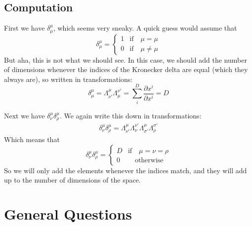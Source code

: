 \documentclass{article}
\begin{document}
		\subsection{Computation}
			First we have $\delta_\mu^\mu$, which seems very sneaky. A quick guess would assume that 
			$$ \delta_\mu^\mu = \begin{cases}
				1 & \text{if} \quad \mu = \mu \\
				0 & \text{if} \quad \mu \neq \mu
			\end{cases}$$
			But aha, this is not what we should see. In this case, we should add the number of dimensions whenever the indices of the Kronecker delta are equal (which they always are), so written in transformations:
			$$ \delta_\mu^\mu = \Lambda_{\nu'}^\mu \Lambda_\mu^{\nu'}= \sum_i^D \frac{\partial x^i}{\partial x^i} =D$$
			
			Next we have $\delta_\nu^\mu \delta_\rho^\mu$. We again write this down in transformations:
			\begin{align*}
				\delta_\nu^\mu \delta_\rho^\mu = \Lambda_{\nu'}^\mu \Lambda_\nu^{\nu'} \Lambda_{\sigma'}^\mu \Lambda_\rho^{\sigma'}
			\end{align*}
			Which means that
			$$ \delta_\nu^\mu \delta_\rho^\mu = \begin{cases}
				D & \text{if} \quad \mu = \nu = \rho \\
				0 & \quad \text{otherwise}
			\end{cases}$$
			So we will only add the elements whenever the indices match, and they will add up to the number of dimensions of the space.
		\pagebreak
	\section{General Questions}
\end{document}

